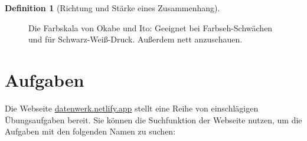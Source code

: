 \documentclass[
  a4paper,
  DIV=11]{scrreprt}
\theoremstyle{definition}
\theoremstyle{definition}
\theoremstyle{definition}
\newtheorem{definition}{Definition}[chapter]
\theoremstyle{remark}
\begin{document}
\begin{definition}[Richtung und Stärke eines
Zusammenhang]
\begin{figure}[H]


\caption{\label{fig-okabe}Die Farbskala von Okabe und Ito: Geeignet bei
Farbseh-Schwächen und für Schwarz-Weiß-Druck. Außerdem nett
anzuschauen.}

\end{figure}%

\section{Aufgaben}\label{aufgaben-3}

Die Webseite \href{https://datenwerk.netlify.app}{datenwerk.netlify.app}
stellt eine Reihe von einschlägigen Übungsaufgaben bereit. Sie können
die Suchfunktion der Webseite nutzen, um die Aufgaben mit den folgenden
Namen zu suchen:


\end{definition}
\end{document}
